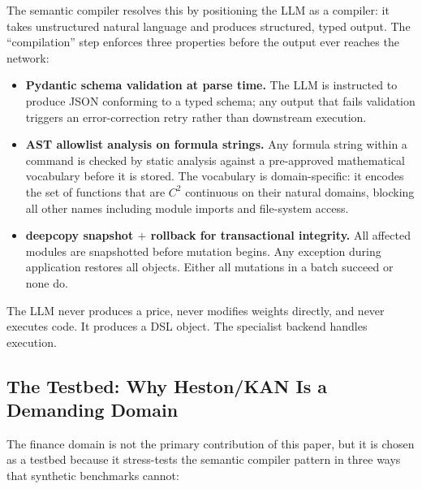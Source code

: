\documentclass[11pt,a4paper]{article}
\begin{document}
The semantic compiler resolves this by positioning the LLM as a compiler: it takes
unstructured natural language and produces structured, typed output. The
``compilation'' step enforces three properties before the output ever reaches the
network:

\begin{itemize}[nosep]
  \item \textbf{Pydantic schema validation at parse time.} The LLM is instructed to
  produce JSON conforming to a typed schema; any output that fails validation triggers
  an error-correction retry rather than downstream execution.

  \item \textbf{AST allowlist analysis on formula strings.} Any formula string within
  a command is checked by static analysis against a pre-approved mathematical vocabulary
  before it is stored. The vocabulary is domain-specific: it encodes the set of
  functions that are $C^2$ continuous on their natural domains, blocking all other
  names including module imports and file-system access.

  \item \textbf{deepcopy snapshot $+$ rollback for transactional integrity.} All
  affected modules are snapshotted before mutation begins. Any exception during
  application restores all objects. Either all mutations in a batch succeed or none do.
\end{itemize}

The LLM never produces a price, never modifies weights directly, and never executes
code. It produces a DSL object. The specialist backend handles execution.

\subsection{The Testbed: Why Heston/KAN Is a Demanding Domain}

The finance domain is not the primary contribution of this paper, but it is chosen
as a testbed because it stress-tests the semantic compiler pattern in three ways that
synthetic benchmarks cannot:
\end{document}
